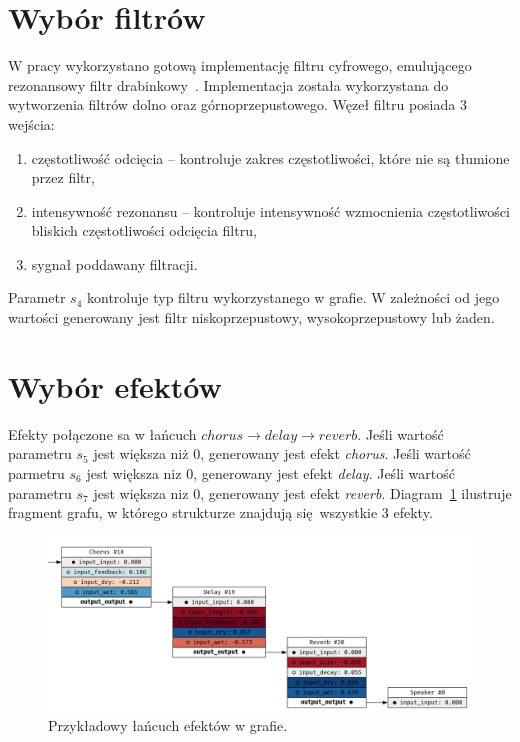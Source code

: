 \section{Wybór filtrów}\label{sec:filters_selection_graph_structure}

W pracy wykorzystano gotową implementację filtru cyfrowego, emulującego
rezonansowy filtr drabinkowy~\cite{ladder_filter_rust}. Implementacja została
wykorzystana do wytworzenia filtrów dolno oraz górnoprzepustowego.
Węzeł filtru posiada 3 wejścia:

\begin{enumerate}
  \item częstotliwość odcięcia -- kontroluje zakres częstotliwości,
    które nie są tłumione przez filtr,
  \item intensywność rezonansu -- kontroluje intensywność wzmocnienia częstotliwości
    bliskich częstotliwości odcięcia filtru,
  \item sygnał poddawany filtracji.
\end{enumerate}

Parametr $s_4$ kontroluje typ filtru wykorzystanego w grafie. W zależności
od jego wartości generowany jest filtr niskoprzepustowy, wysokoprzepustowy lub
żaden.


\section{Wybór efektów}

Efekty połączone sa w łańcuch
$chorus \rightarrow delay \rightarrow reverb$. Jeśli wartość parametru $s_5$ jest
większa niż 0, generowany jest efekt \textit{chorus}. Jeśli wartość
parmetru $s_6$ jest większa niz 0, generowany jest efekt \textit{delay}.
Jeśli wartość parametru $s_7$ jest większa niz 0, generowany jest efekt \textit{reverb}.
Diagram~\ref{fig:example_generated_effects} ilustruje fragment grafu,
w którego strukturze znajdują się wszystkie 3 efekty.

\begin{figure}[H]
    \centering
    \includegraphics[width=1.0\linewidth]{rys06/example_generated_effects.png}
    \caption{
      Przykładowy łańcuch efektów w grafie.
    }\label{fig:example_generated_effects}
\end{figure}

